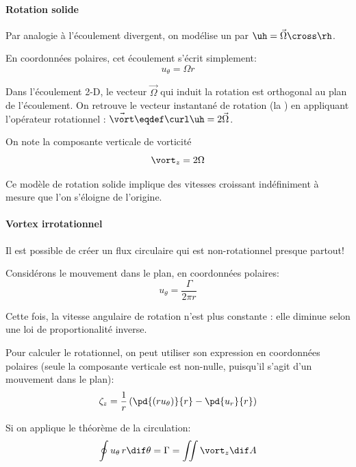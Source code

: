 \paragraph{Rotation solide\label{para:Vortex}}
Par analogie à l'écoulement divergent, on modélise un  par $\uh=\vec{\Omega} \cross \rh$.

En coordonnées polaires, cet écoulement s'écrit simplement:
\begin{displaymath}
  u_\theta = \Omega r
\end{displaymath}

Dans l'écoulement 2-D, le vecteur $\vec\Omega$ qui induit la rotation est orthogonal au plan de l'écoulement. On retrouve le vecteur instantané de rotation (la ) en appliquant l'opérateur rotationnel : $\vec\vort \eqdef \curl\uh=2\vec\Omega$.

On note la composante verticale de vorticité
\begin{displaymath}
  \vort_z = 2 \Omega
\end{displaymath}

Ce modèle de rotation solide implique des vitesses croissant indéfiniment à mesure que l'on s'éloigne de l'origine.

\paragraph{Vortex irrotationnel}
Il est possible de créer un flux circulaire qui est non-rotationnel presque partout!

Considérons le mouvement dans le plan, en coordonnées polaires:
\begin{displaymath}
  u_\theta = \frac {\Gamma}{2\pi r}
\end{displaymath}

Cette fois, la vitesse angulaire de rotation n'est plus constante : elle diminue selon une loi de proportionalité inverse.

Pour calculer le rotationnel, on peut utiliser son expression en coordonnées polaires (seule la composante verticale est non-nulle, puisqu'il s'agit d'un mouvement dans le plan):
\begin{displaymath}
  \zeta_z =%
  \frac{1}{r}%
  \left(\pd{(r u_\theta)}{r} - \pd{u_r}{r}\right)
\end{displaymath}

Si on applique le théorème de la circulation:
\begin{displaymath}
  \oint u_\theta\,r\dif \theta = \Gamma = \iint \vort_z \dif A
\end{displaymath}

